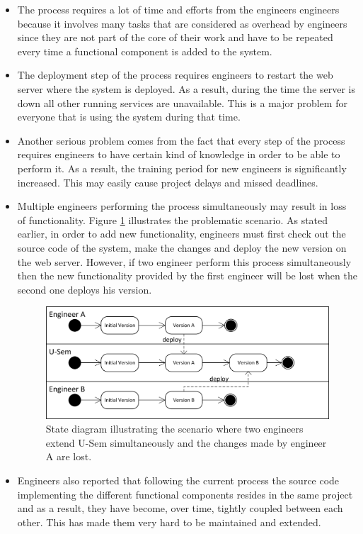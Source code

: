 \begin{itemize}

	\item The process requires a lot of time and efforts from the engineers engineers because it involves many tasks that are considered as overhead by engineers since they are not part of the core of their work and have to be repeated every time a functional component is added to the system.
	
	\item The deployment step of the process requires engineers to restart the web server where the system is deployed. As a result, during the time the server is down all other running services are unavailable. This is a major problem for everyone that is using the system during that time.
	
	\item Another serious problem comes from the fact that every step of the process requires engineers to have certain kind of knowledge in order to be able to perform it. As a result, the training period for new engineers is significantly increased. This may easily cause project delays and missed deadlines.
	
	\item Multiple engineers performing the process simultaneously may result in loss of functionality. Figure \ref{fig_vers_prob} illustrates the problematic scenario. As stated earlier, in order to add new functionality, engineers must first check out the source code of the system, make the changes and deploy the new version on the web server. However, if two engineer perform this process simultaneously then the new functionality provided by the first engineer will be lost when the second one deploys his version. 
	
	\begin{figure}[h!]
  \centering
  	\includegraphics[scale=0.75]{plug-in/version_problem.png}
  \caption{State diagram illustrating the scenario where two engineers extend U-Sem simultaneously and the changes made by engineer A are lost.  }
  \label{fig_vers_prob}
\end{figure}
	
	\item Engineers also reported that following the current process the source code implementing the different functional components resides in the same project and as a result, they have become, over time, tightly coupled between each other. This has made them very hard to be maintained and extended.
		
\end{itemize}

